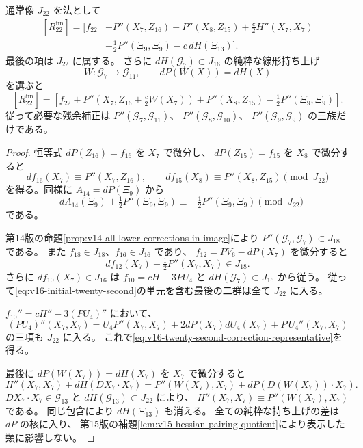 \begin{theorem}[二十二次の実際の類の代表]
\label{thm:v16-twenty-second-correction-representative}
通常像 $J_{22}$ を法として
\begin{equation}\label{eq:v16-twenty-second-correction-representative}
\begin{split}
 [R_{22}^{\mathrm{fin}}]=\bigl[ f_{22}
  &+P''(X_7,Z_{16})+P''(X_8,Z_{15})
    +\tfrac c2H''(X_7,X_7)\\
  &-\tfrac12P''(\Xi_9,\Xi_9)-c\,dH(\Xi_{13})\bigr].
\end{split}
\end{equation}
最後の項は $J_{22}$ に属する。
さらに $dH(\mathcal G_7)\subset J_{16}$ の純粋な線形持ち上げ
\[
 W:\mathcal G_7\longrightarrow\mathcal G_{11},\qquad
 dP(W(X))=dH(X)
\]
を選ぶと
\begin{equation}\label{eq:v16-three-quadratic-families}
\boxed{\displaystyle
 [R_{22}^{\mathrm{fin}}]=
 \left[f_{22}+P''\!\left(X_7,Z_{16}+\tfrac c2W(X_7)\right)
       +P''(X_8,Z_{15})-\tfrac12P''(\Xi_9,\Xi_9)\right].}
\end{equation}
従って必要な残余補正は
$P''(\mathcal G_7,\mathcal G_{11})$、
$P''(\mathcal G_8,\mathcal G_{10})$、
$P''(\mathcal G_9,\mathcal G_9)$ の三族だけである。
\end{theorem}

\begin{proof}
恒等式 $dP(Z_{16})=f_{16}$ を $X_7$ で微分し、
$dP(Z_{15})=f_{15}$ を $X_8$ で微分すると
\[
 df_{16}(X_7)\equiv P''(X_7,Z_{16}),\qquad
 df_{15}(X_8)\equiv P''(X_8,Z_{15})\pmod{J_{22}}
\]
を得る。同様に $A_{14}=dP(\Xi_9)$ から
\[
 -dA_{14}(\Xi_9)+\tfrac12P''(\Xi_9,\Xi_9)
       \equiv-\tfrac12P''(\Xi_9,\Xi_9)\pmod{J_{22}}
\]
である。

第14版の命題\ref{prop:v14-all-lower-corrections-in-image}により
$P''(\mathcal G_7,\mathcal G_7)\subset J_{18}$ である。
また $f_{18}\in J_{18}$、$f_{16}\in J_{16}$ であり、
$f_{12}=PV_6-dP(X_7)$ を微分すると
\[
 df_{12}(X_7)+\tfrac12P''(X_7,X_7)\in J_{18}.
\]
さらに $df_{10}(X_7)\in J_{16}$ は
$f_{10}=cH-3PU_4$ と $dH(\mathcal G_7)\subset J_{16}$ から従う。
従って\eqref{eq:v16-initial-twenty-second}の単元を含む最後の二群は全て $J_{22}$ に入る。

$f_{10}''=cH''-3(PU_4)''$ において、
\[
 (PU_4)''(X_7,X_7)
 =U_4P''(X_7,X_7)+2dP(X_7)dU_4(X_7)
                        +P\,U_4''(X_7,X_7)
\]
の三項も $J_{22}$ に入る。
これで\eqref{eq:v16-twenty-second-correction-representative}を得る。

最後に $dP(W(X_7))=dH(X_7)$ を $X_7$ で微分すると
\[
 H''(X_7,X_7)+dH(DX_7\cdot X_7)
 =P''(W(X_7),X_7)+dP(D(W(X_7))\cdot X_7).
\]
$DX_7\cdot X_7\in\mathcal G_{13}$ と
$dH(\mathcal G_{13})\subset J_{22}$ により、
$H''(X_7,X_7)\equiv P''(W(X_7),X_7)$ である。
同じ包含により $dH(\Xi_{13})$ も消える。
全ての純粋な持ち上げの差は $dP$ の核に入り、
第15版の補題\ref{lem:v15-hessian-pairing-quotient}により表示した類に影響しない。
\end{proof}


